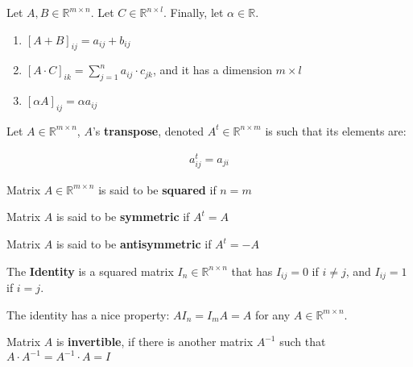 \documentclass[aspectratio=169]{beamer}
\begin{document}
\begin{frame}
    Let $A,B\in\mathds{R}^{m\times n}$. Let $C\in\mathds{R}^{n\times l}$. Finally, let $\alpha\in\mathds{R}$.
    \begin{enumerate}
        \item $[A+B]_{ij} = a_{ij}+b_{ij}$
        \item $[A \cdot C]_{ik}=\sum_{j=1}^n a_{ij}\cdot c_{jk}$, and it has a dimension $m\times l$
        \item $[\alpha A]_{ij}=\alpha a_{ij}$
    \end{enumerate}
\end{frame}

\begin{frame}
    \begin{definition}
        Let $A\in\mathds{R}^{m\times n}$, $A$'s \textbf{transpose}, denoted $A^t\in\mathds{R}^{n\times m}$ is such that its elements are:
        
        \begin{align*}
            a^t_{ij}=a_{ji}
        \end{align*}
    \end{definition}
    
    \begin{definition}
        Matrix $A\in\mathds{R}^{m\times n}$ is said to be \textbf{squared} if $n=m$
    \end{definition}
    
    \begin{definition}
        Matrix $A$ is said to be \textbf{symmetric} if $A^t=A$
    \end{definition}
    \begin{definition}
        Matrix $A$ is said to be \textbf{antisymmetric} if $A^t=-A$
    \end{definition}
\end{frame}

\begin{frame}
    \begin{definition}
        The \textbf{Identity} is a squared matrix $I_n\in\mathds{R}^{n\times n}$ that has $I_{ij}=0$ if $i\neq j$, and $I_{ij}=1$ if $i=j$.
    \end{definition}
    
    The identity has a nice property: $A I_n = I_m A= A$ for any $A\in\mathds{R}^{m\times n}$.
    
    \begin{definition}
        Matrix $A$ is \textbf{invertible}, if there is another matrix $A^{-1}$ such that $A\cdot A^{-1} = A^{-1}\cdot A = I$
    \end{definition}
\end{frame}
\end{document}
